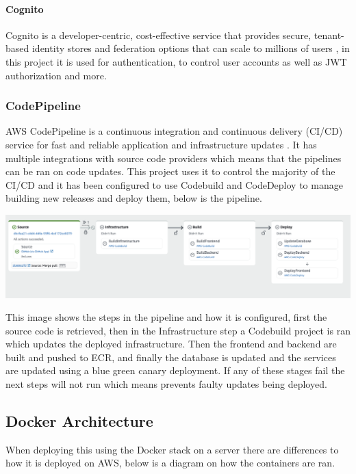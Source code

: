 \documentclass[]{project_report}
\begin{document}
\paragraph{Cognito}
Cognito is a developer-centric, cost-effective service that provides secure, tenant-based identity stores and federation options that can scale to millions of users \cite{aws_cognito}, in this project it is used for authentication, to control user accounts as well as JWT authorization and more.

\subsubsection{CodePipeline}

AWS CodePipeline is a continuous integration and continuous delivery (CI/CD) service for fast and reliable application and infrastructure updates \cite{aws_codepipeline}. It has multiple integrations with source code providers which means that the pipelines can be ran on code updates. This project uses it to control the majority of the CI/CD and it has been configured to use Codebuild and CodeDeploy to manage building new releases and deploy them, below is the pipeline.

\includegraphics[width=\textwidth]{images/CodePipeline.png}

This image shows the steps in the pipeline and how it is configured, first the source code is retrieved, then in the Infrastructure step a Codebuild project is ran which updates the deployed infrastructure. Then the frontend and backend are built and pushed to ECR, and finally the database is updated and the services are updated using a blue green canary deployment. If any of these stages fail the next steps will not run which means prevents faulty updates being deployed.


\subsection{Docker Architecture}

When deploying this using the Docker stack on a server there are differences to how it is deployed on AWS, below is a diagram on how the containers are ran.
\end{document}
